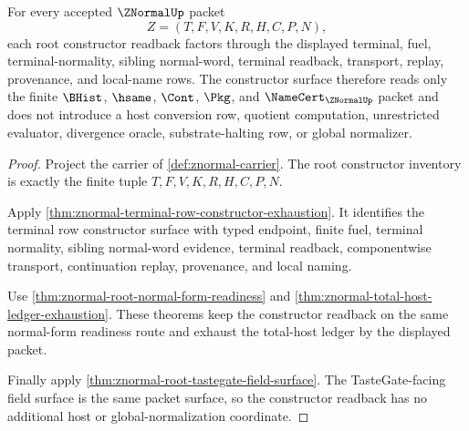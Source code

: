 \begin{theorem}
\label{thm:znormal-root-constructor-readback}
For every accepted $\ZNormalUp$ packet
$$
Z=(T,F,V,K,R,H,C,P,N),
$$
each root constructor readback factors through the displayed terminal, fuel, terminal-normality, sibling normal-word, terminal readback, transport, replay, provenance, and local-name rows. The constructor surface therefore reads only the finite $\BHist$, $\hsame$, $\Cont$, $\Pkg$, and $\NameCert_{\ZNormalUp}$ packet and does not introduce a host conversion row, quotient computation, unrestricted evaluator, divergence oracle, substrate-halting row, or global normalizer.
\end{theorem}
\begin{proof}
Project the carrier of \autoref{def:znormal-carrier}. The root constructor inventory is exactly the finite tuple $T,F,V,K,R,H,C,P,N$.

Apply \autoref{thm:znormal-terminal-row-constructor-exhaustion}. It identifies the terminal row constructor surface with typed endpoint, finite fuel, terminal normality, sibling normal-word evidence, terminal readback, componentwise transport, continuation replay, provenance, and local naming.

Use \autoref{thm:znormal-root-normal-form-readiness} and \autoref{thm:znormal-total-host-ledger-exhaustion}. These theorems keep the constructor readback on the same normal-form readiness route and exhaust the total-host ledger by the displayed packet.

Finally apply \autoref{thm:znormal-root-tastegate-field-surface}. The TasteGate-facing field surface is the same packet surface, so the constructor readback has no additional host or global-normalization coordinate.
\end{proof}

